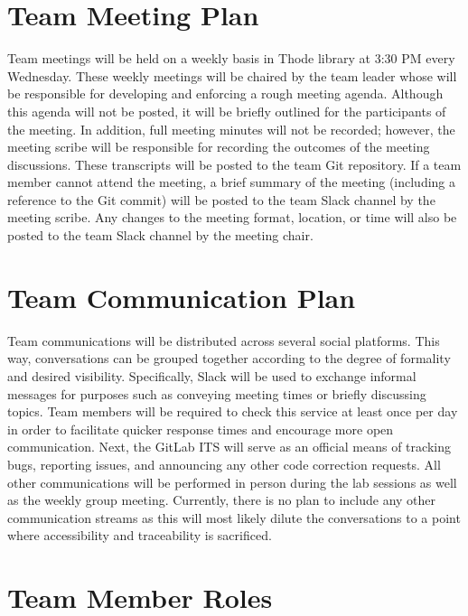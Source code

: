 \documentclass{article}
\begin{document}
\section{Team Meeting Plan}
\label{meeting_label}
\indent
Team meetings will be held on a weekly basis in Thode library at 3:30 PM every Wednesday.  These weekly meetings will be chaired by the team leader whose will be responsible for developing and enforcing a rough meeting agenda.  Although this agenda will not be posted, it will be briefly outlined for the participants of the meeting.  In addition, full meeting minutes will not be recorded; however, the meeting scribe will be responsible for recording the outcomes of the meeting discussions.  These transcripts will be posted to the team Git repository.  If a team member cannot attend the meeting, a brief summary of the meeting (including a reference to the Git commit) will be posted to the team Slack channel by the meeting scribe.  Any changes to the meeting format, location, or time will also be posted to the team Slack channel by the meeting chair.

\section{Team Communication Plan}
\label{communication_label}

\indent
Team communications will be distributed across several social platforms.  This way, conversations can be grouped together according to the degree of formality and desired visibility.  Specifically, Slack will be used to exchange informal messages for purposes such as conveying meeting times or briefly discussing topics.  Team members will be required to check this service at least once per day in order to facilitate quicker response times and encourage more open communication.  Next, the GitLab ITS will serve as an official means of tracking bugs, reporting issues, and announcing any other code correction requests.  All other communications will be performed in person during the lab sessions as well as the weekly group meeting.  Currently, there is no plan to include any other communication streams as this will most likely dilute the conversations to a point where accessibility and traceability is sacrificed.

\section{Team Member Roles}
\label{roles_label}
\end{document}
